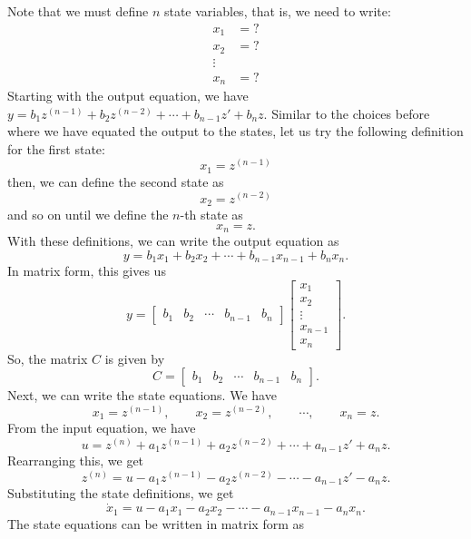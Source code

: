 \documentclass{ee122_notes}
\begin{document}
Note that we must define $n$ state variables, that is, we need to write:
\begin{align*}
x_1 &= ? \\
x_2 &= ? \\
\vdots \\
x_n &= ? 
\end{align*}
Starting with the output equation, we have $y = b_{1} z^{(n-1)} + b_2 z^{(n-2)} + \cdots + b_{n-1} z' + b_n z$. Similar to the choices before where we have equated the output to the states, let us try the following definition for the first state:
\[
x_1 = z^{(n-1)}
\]
then, we can define the second state as
\[
x_2 = z^{(n-2)}
\]
and so on until we define the $n$-th state as
\[
x_n = z.
\]
With these definitions, we can write the output equation as
\[
y = b_{1} x_1 + b_2 x_2 + \cdots + b_{n-1} x_{n-1} + b_n x_n.
\]
In matrix form, this gives us 
\[
y = \begin{bmatrix}b_1 & b_2 & \cdots & b_{n-1} & b_n\end{bmatrix} \begin{bmatrix}x_1 \\ x_2 \\ \vdots \\ x_{n-1} \\ x_n\end{bmatrix}.
\]
So, the matrix $C$ is given by
\[
C = \begin{bmatrix}b_1 & b_2 & \cdots & b_{n-1} & b_n\end{bmatrix}.
\]
Next, we can write the state equations. We have
\[
x_1 = z^{(n-1)}, \qquad x_2 = z^{(n-2)}, \qquad \cdots, \qquad x_n = z.
\]
From the input equation, we have
\[
u = z^{(n)} + a_1 z^{(n-1)} + a_2 z^{(n-2)} + \cdots + a_{n-1} z' + a_n z.
\]
Rearranging this, we get
\[
z^{(n)} = u - a_1 z^{(n-1)} - a_2 z^{(n-2)} - \cdots - a_{n-1} z' - a_n z.
\]
Substituting the state definitions, we get
\[
\dot{x}_1 = u - a_1 x_1 - a_2 x_2 - \cdots - a_{n-1} x_{n-1} - a_n x_n.
\]
The state equations can be written in matrix form as
\end{document}
